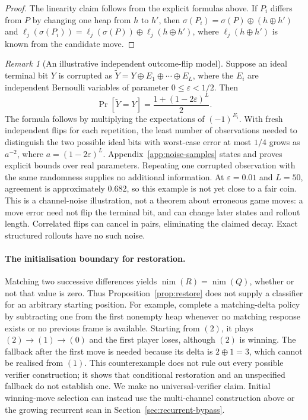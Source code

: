 \documentclass[11pt]{article}
\theoremstyle{plain}
\theoremstyle{definition}
\theoremstyle{remark}
\newtheorem{remark}[theorem]{Remark}
\numberwithin{equation}{section}
\begin{document}
\begin{proof}
The linearity claim follows from the explicit formulas above.
If $P_i$ differs from $P$ by changing one heap from $h$ to $h'$, then $\sigma(P_i)=\sigma(P)\oplus(h\oplus h')$ and $\ell_j(\sigma(P_i))=\ell_j(\sigma(P))\oplus \ell_j(h\oplus h')$, where $\ell_j(h\oplus h')$ is known from the candidate move.
\end{proof}

\begin{remark}[An illustrative independent outcome-flip model]
\label{rem:noisy-rollout-decay}
Suppose an ideal terminal bit $Y$ is corrupted as $\widetilde Y=Y\oplus E_1\oplus\cdots\oplus E_L$, where the $E_i$ are independent Bernoulli variables of parameter $0\le\varepsilon<1/2$. Then
\[
\Pr[\widetilde Y=Y]=\frac{1+(1-2\varepsilon)^L}{2}.
\]
The formula follows by multiplying the expectations of $(-1)^{E_i}$. With fresh independent flips for each repetition, the least number of observations needed to distinguish the two possible ideal bits with worst-case error at most $1/4$ grows as $a^{-2}$, where $a=(1-2\varepsilon)^L$. Appendix~\ref{app:noise-samples} states and proves explicit bounds over real parameters. Repeating one corrupted observation with the same randomness supplies no additional information.
At $\varepsilon=0.01$ and $L=50$, agreement is approximately $0.682$, so this example is not yet close to a fair coin.
This is a channel-noise illustration, not a theorem about erroneous game moves: a move error need not flip the terminal bit, and can change later states and rollout length. Correlated flips can cancel in pairs, eliminating the claimed decay. Exact structured rollouts have no such noise.
\end{remark}

\paragraph{The initialisation boundary for restoration.}
Matching two successive differences yields $\operatorname{nim}(R)=\operatorname{nim}(Q)$, whether or not that value is zero. Thus Proposition~\ref{prop:restore} does not supply a classifier for an arbitrary starting position.
For example, complete a matching-delta policy by subtracting one from the first nonempty heap whenever no matching response exists or no previous frame is available. Starting from $(2)$, it plays $(2)\to(1)\to(0)$ and the first player loses, although $(2)$ is winning. The fallback after the first move is needed because its delta is $2\oplus1=3$, which cannot be realised from $(1)$.
This counterexample does not rule out every possible verifier construction; it shows that conditional restoration and an unspecified fallback do not establish one. We make no universal-verifier claim. Initial winning-move selection can instead use the multi-channel construction above or the growing recurrent scan in Section~\ref{sec:recurrent-bypass}.
\end{document}

